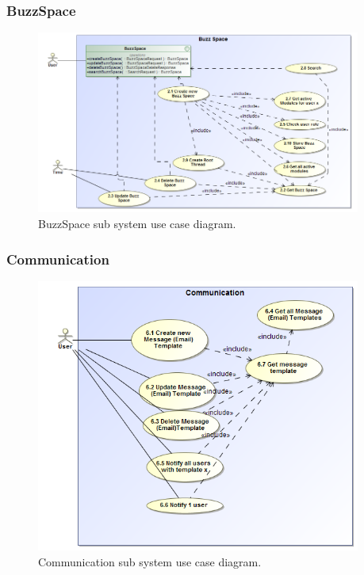 \documentclass [a4paper,12pt] {article}
\begin{document}
		\subsubsection{BuzzSpace}
			\begin{figure}[H]
				\centering
				\includegraphics[width=0.95\textwidth]{BuzzSpaceUC.png}
				\caption{BuzzSpace sub system use case diagram.}
			\end{figure}
		\subsubsection{Communication}
			\begin{figure}[H]
				\centering
				\includegraphics[width=0.95\textwidth]{CommunicationUC.png}
				\caption{Communication sub system use case diagram.}
			\end{figure}
\end{document}

